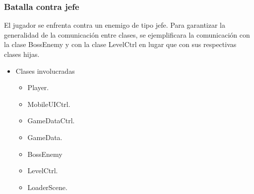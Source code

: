 \subsubsection{Batalla contra jefe}
	El jugador se enfrenta contra un enemigo de tipo jefe. Para garantizar la 
	generalidad de la comunicación entre clases, se ejemplificara la comunicación 
	con la clase BossEnemy y con la clase LevelCtrl en lugar que con sus 
	respectivas clases hijas.
		
	\begin{itemize}
		\item Clases involucradas
			\begin{itemize}
				\item Player.
				\item MobileUICtrl.
				\item GameDataCtrl.
				\item GameData.
				\item BossEnemy
				\item LevelCtrl.
				\item LoaderScene.
			\end{itemize}
			

\end{itemize}
